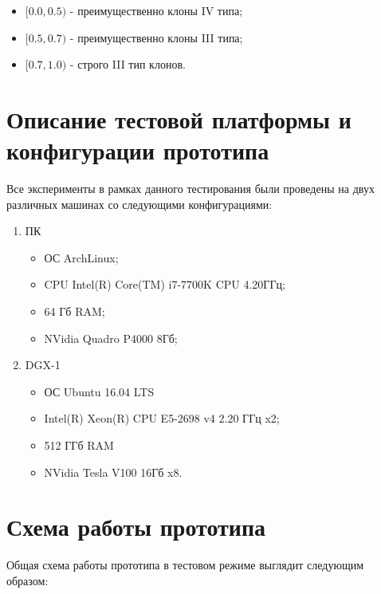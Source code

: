 \begin{itemize}
\setlength\itemsep{0mm}
\item \([0.0, 0.5)\) - преимущественно клоны IV типа;
\item \([0.5, 0.7)\) - преимущественно клоны III типа;
\item \([0.7, 1.0)\) - строго III тип клонов.
\end{itemize}

\section{Описание тестовой платформы и конфигурации прототипа}

Все эксперименты в рамках данного тестирования были проведены на двух различных машинах со следующими конфигурациями:

\begin{enumerate}
\setlength\itemsep{0mm}
\item ПК
\begin{itemize}
\setlength\itemsep{0mm}
\item ОС ArchLinux;
\item CPU Intel(R) Core(TM) i7-7700K CPU 4.20ГГц;
\item 64 Гб RAM;
\item NVidia Quadro P4000 8Гб;
\end{itemize}
\item DGX-1
\begin{itemize}
\setlength\itemsep{0mm}
\item ОС Ubuntu 16.04 LTS
\item Intel(R) Xeon(R) CPU E5-2698 v4 2.20 ГГц x2;
\item 512 ГГб RAM
\item NVidia Tesla V100 16Гб x8.
\end{itemize}
\end{enumerate}

\section{Схема работы прототипа}

Общая схема работы прототипа в тестовом режиме выглядит следующим образом:

